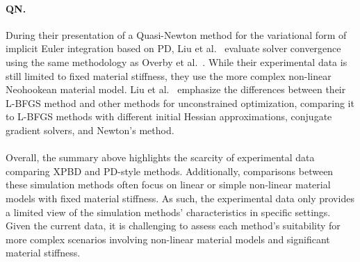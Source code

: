 \paragraph{QN.}
During their presentation of a Quasi-Newton method for the variational form of implicit Euler integration based on PD, Liu et 
al.\ \cite{liu2017} evaluate solver convergence using the same methodology as Overby et al.\ \cite{overby2017}. While their 
experimental data is still limited to fixed material stiffness, they use the more complex non-linear Neohookean material model. 
Liu et al.\ \cite{liu2017} emphasize the differences between their L-BFGS method and other methods for unconstrained 
optimization, comparing it to L-BFGS methods with different initial Hessian approximations, conjugate gradient solvers, and Newton's method.

\paragraph{}
\noindent Overall, the summary above highlights the scarcity of experimental data comparing XPBD and PD-style methods. Additionally, 
comparisons between these simulation methods often focus on linear or simple non-linear material models with fixed material stiffness. 
As such, the experimental data only provides a limited view of the simulation methods' characteristics in specific settings. Given the 
current data, it is challenging to assess each method's suitability for more complex scenarios involving non-linear material models and 
significant material stiffness.
